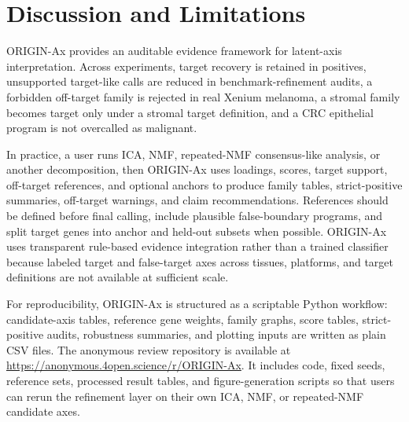 \documentclass[conference]{IEEEtran}
\begin{document}
\section{Discussion and Limitations}

ORIGIN-Ax provides an auditable evidence framework for latent-axis
interpretation. Across experiments, target recovery is retained in positives,
unsupported target-like calls are reduced in benchmark-refinement audits, a
forbidden off-target family is rejected in real Xenium melanoma, a stromal
family becomes target only under a stromal target definition, and a CRC
epithelial program is not overcalled as malignant.

In practice, a user runs ICA, NMF, repeated-NMF consensus-like analysis, or
another decomposition, then ORIGIN-Ax uses loadings, scores, target support,
off-target references, and optional anchors to produce family tables,
strict-positive summaries, off-target warnings, and claim recommendations.
References should be defined before final calling, include plausible
false-boundary programs, and split target genes into anchor and held-out subsets
when possible. ORIGIN-Ax uses transparent rule-based evidence integration rather
than a trained classifier because labeled target and false-target axes across
tissues, platforms, and target definitions are not available at sufficient
scale.

For reproducibility, ORIGIN-Ax is structured as a scriptable Python workflow:
candidate-axis tables, reference gene weights, family graphs, score tables,
strict-positive audits, robustness summaries, and plotting inputs are written as
plain CSV files. The anonymous review repository is available at
\url{https://anonymous.4open.science/r/ORIGIN-Ax}. It includes code, fixed
seeds, reference sets, processed result tables, and figure-generation scripts so
that users can rerun the refinement layer on their own ICA, NMF, or repeated-NMF
candidate axes.
\end{document}
